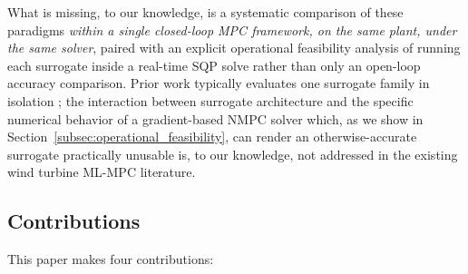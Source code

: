 What is missing, to our knowledge, is a systematic comparison of these
paradigms \emph{within a single closed-loop MPC framework, on the same
plant, under the same solver}, paired with an explicit operational
feasibility analysis of running each surrogate inside a real-time SQP
solve rather than only an open-loop accuracy comparison. Prior work
typically evaluates one surrogate family in isolation
\cite{klein2024,kocijan2004,hewing2020}; the interaction between
surrogate architecture and the specific numerical behavior of a
gradient-based NMPC solver which, as we show in
Section~\ref{subsec:operational_feasibility}, can render an
otherwise-accurate surrogate practically unusable is, to our knowledge,
not addressed in the existing wind turbine ML-MPC literature.

\subsection{Contributions}
\label{subsec:contributions}

This paper makes four contributions:

